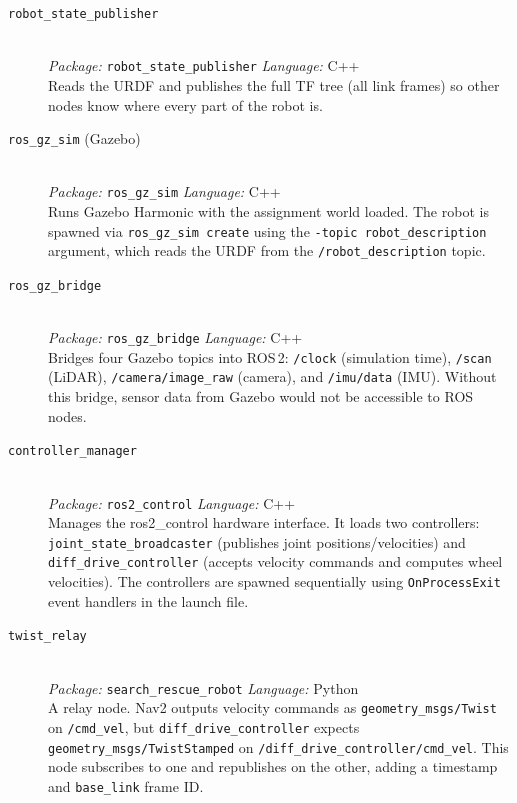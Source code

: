 \documentclass[12pt, a4paper]{article}
\begin{document}
\begin{description}
    \item[\texttt{robot\_state\_publisher}] \hfill \\
    \textit{Package:} \texttt{robot\_state\_publisher} \quad \textit{Language:} C++ \\
    Reads the URDF and publishes the full TF tree (all link frames) so other nodes know where every part of the robot is.

    \item[\texttt{ros\_gz\_sim} (Gazebo)] \hfill \\
    \textit{Package:} \texttt{ros\_gz\_sim} \quad \textit{Language:} C++ \\
    Runs Gazebo Harmonic with the assignment world loaded. The robot is spawned via \texttt{ros\_gz\_sim create} using the \texttt{-topic robot\_description} argument, which reads the URDF from the \texttt{/robot\_description} topic.

    \item[\texttt{ros\_gz\_bridge}] \hfill \\
    \textit{Package:} \texttt{ros\_gz\_bridge} \quad \textit{Language:} C++ \\
    Bridges four Gazebo topics into ROS\,2: \texttt{/clock} (simulation time), \texttt{/scan} (LiDAR), \texttt{/camera/image\_raw} (camera), and \texttt{/imu/data} (IMU). Without this bridge, sensor data from Gazebo would not be accessible to ROS nodes.

    \item[\texttt{controller\_manager}] \hfill \\
    \textit{Package:} \texttt{ros2\_control} \quad \textit{Language:} C++ \\
    Manages the ros2\_control hardware interface. It loads two controllers: \texttt{joint\_state\_broadcaster} (publishes joint positions/velocities) and \texttt{diff\_drive\_controller} (accepts velocity commands and computes wheel velocities). The controllers are spawned sequentially using \texttt{OnProcessExit} event handlers in the launch file.

    \item[\texttt{twist\_relay}] \hfill \\
    \textit{Package:} \texttt{search\_rescue\_robot} \quad \textit{Language:} Python \\
    A relay node. Nav2 outputs velocity commands as \texttt{geometry\_msgs/Twist} on \texttt{/cmd\_vel}, but \texttt{diff\_drive\_controller} expects \texttt{geometry\_msgs/TwistStamped} on \texttt{/diff\_drive\_controller/cmd\_vel}. This node subscribes to one and republishes on the other, adding a timestamp and \texttt{base\_link} frame ID.


\end{description}
\end{document}
